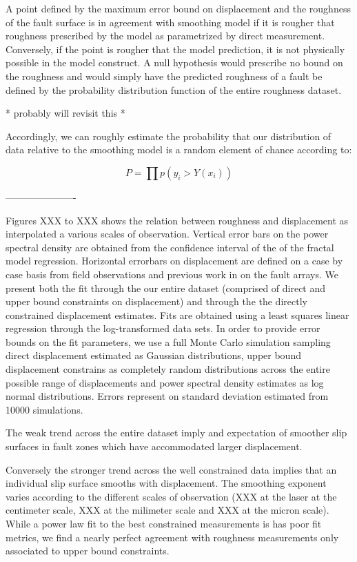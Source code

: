 \documentclass[12pt,a4paper]{article}
\begin{document}
A point defined by the maximum error bound on displacement and the roughness of the fault surface is in agreement with smoothing model if it is rougher that roughness prescribed by the model as parametrized by direct measurement. Conversely, if the point is rougher that the model prediction, it is not physically possible in the model construct. A null hypothesis would prescribe no bound on the roughness and would simply have the predicted roughness of a fault be defined by the probability distribution function of the entire roughness dataset.

* probably will revisit this *

Accordingly, we can roughly estimate the probability that our distribution of data relative to the smoothing model is a random element of chance according to:

\begin{equation}
 P = \prod p(y_i>Y(x_i))
\end{equation} 
 
 
----------------------

Figures XXX to XXX shows the relation between roughness and displacement as interpolated a various scales of observation. Vertical error bars on the power spectral density are obtained from the confidence interval of the of the fractal model regression. Horizontal errorbars on displacement are defined on a case by case basis from field observations and previous work in on the fault arrays. We present both the fit through the our entire dataset (comprised of direct and upper bound constraints on displacement) and through the the directly constrained displacement estimates. Fits are obtained using a least squares linear regression through the log-transformed data sets. In order to provide error bounds on the fit parameters, we use a full Monte Carlo simulation sampling direct displacement estimated as Gaussian distributions, upper bound displacement constrains as completely random distributions across the entire possible range of displacements and power spectral density estimates as log normal distributions. Errors represent on standard deviation estimated from 10000 simulations.

The weak trend across the entire dataset imply and expectation of smoother slip surfaces in fault zones which have accommodated larger displacement. 

Conversely the stronger trend across the well constrained data implies that an individual slip surface smooths with displacement. The smoothing exponent varies according to the different scales of observation (XXX at the laser at the centimeter scale, XXX at the milimeter scale and XXX at the micron scale).  While a power law fit to the best constrained measurements is has poor fit metrics, we find a nearly perfect agreement with roughness measurements only associated to upper bound constraints.
\end{document}
